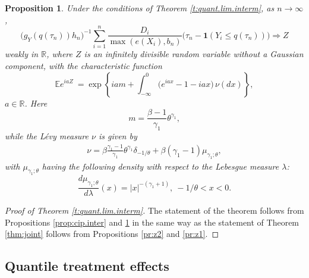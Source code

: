\documentclass[12pt]{amsart}
\newcommand{\bbr}{\mathbb{R}}
\newcommand{\1}{\mathbbm{1}}
\newcommand{\0}{\mathbf{0}}
\newcommand{\one}{\mathbf{1}}
\newcommand{\E}{\mathbb{E}}
\theoremstyle{plain}
\newtheorem{proposition}[theorem]{Proposition}
\theoremstyle{definition}
\begin{document}
\begin{proposition} \label{pr:Z1.inter}
Under the conditions of Theorem \ref{t:quant.lim.interm}, as $n\to\infty$, 
$$
\bigl(g_Y(q(\tau_n))h_n\bigr)^{-1} \sum_{i=1}^n \frac{D_i}{\max(e(X_i),b_n)}
  \bigl( \tau_n-\one(Y_i\leq q(\tau_n))\bigr)  
 \Rightarrow Z 
$$
weakly in $\bbr$, where $Z$ is an
infinitely divisible random variable 
without a Gaussian component, with the characteristic function
$$
\E e^{iaZ}\ = \exp\left\{ iam + \int_{-\infty}^0 \bigl(e^{iax}-1
  -iax\bigr)\, \nu(dx)\right\},
$$
$a\in\bbr$. Here
%
\begin{equation*} \label{e:lim.mean.interm}
  m= \frac{\beta-1}{\gamma_1}\theta^{\gamma_1},\end{equation*}
%
while the L\'evy measure
$\nu$  is given by 
 \begin{align*}
\nu= \beta \frac{\gamma_1-1}{\gamma_1}
      \theta^{\gamma_1} \delta_{-1/\theta} + \beta(\gamma_1-1)
   \mu_{\gamma_1; \theta},
 \end{align*}
 with $ \mu_{\gamma_1; \theta}$ having the following density with respect to the
 Lebesgue measure $\lambda$: 
 $$
 \frac{d \mu_{\gamma_1; \theta}}{d\lambda}(x) = |x|^{-(\gamma_1+1)},
 \ -1/\theta<x<0.
 $$
 
\end{proposition}


 \begin{proof}[Proof of Theorem \ref{t:quant.lim.interm}]
The statement of the theorem follows from Propositions \ref{prop:cip.inter} and \ref{pr:Z1.inter} in the same way as the statement of Theorem \ref{thm:joint} follows from 
Propositions \ref{pr:z2} and \ref{pr:z1}. 
\end{proof}


\subsection{Quantile treatment effects}
\end{document}
